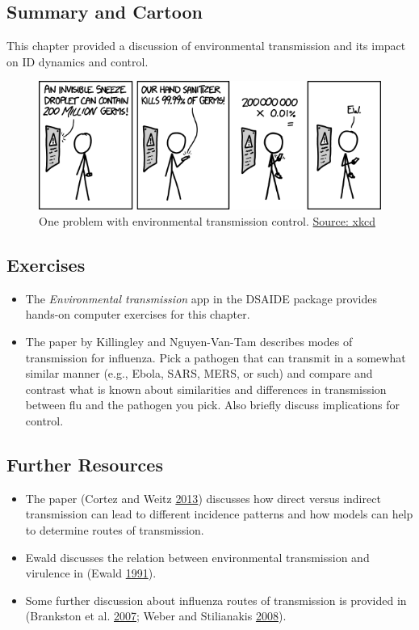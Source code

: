 \documentclass[]{article}
\providecommand{\tightlist}{%
  \setlength{\itemsep}{0pt}\setlength{\parskip}{0pt}}
\theoremstyle{definition}
\theoremstyle{definition}
\theoremstyle{definition}
\theoremstyle{remark}
\begin{document}
\subsection{Summary and Cartoon}\label{summary-and-cartoon-6}

This chapter provided a discussion of environmental transmission and its
impact on ID dynamics and control.

\begin{figure}
\centering
\includegraphics{./images/xkcd-hand_sanitizer.png}
\caption{One problem with environmental transmission control.
\href{https://xkcd.com/1161/}{Source: xkcd}}
\end{figure}

\subsection{Exercises}\label{exercises-6}

\begin{itemize}
\tightlist
\item
  The \emph{Environmental transmission} app in the DSAIDE package
  provides hands-on computer exercises for this chapter.
\item
  The paper by Killingley and Nguyen-Van-Tam describes modes of
  transmission for influenza. Pick a pathogen that can transmit in a
  somewhat similar manner (e.g., Ebola, SARS, MERS, or such) and compare
  and contrast what is known about similarities and differences in
  transmission between flu and the pathogen you pick. Also briefly
  discuss implications for control.
\end{itemize}

\subsection{Further Resources}\label{further-resources-6}

\begin{itemize}
\tightlist
\item
  The paper (Cortez and Weitz \protect\hyperlink{ref-cortez13}{2013})
  discusses how direct versus indirect transmission can lead to
  different incidence patterns and how models can help to determine
  routes of transmission.
\item
  Ewald discusses the relation between environmental transmission and
  virulence in (Ewald \protect\hyperlink{ref-ewald91}{1991}).
\item
  Some further discussion about influenza routes of transmission is
  provided in (Brankston et al.
  \protect\hyperlink{ref-brankston07}{2007}; Weber and Stilianakis
  \protect\hyperlink{ref-weber08}{2008}).
\end{itemize}
\end{document}
